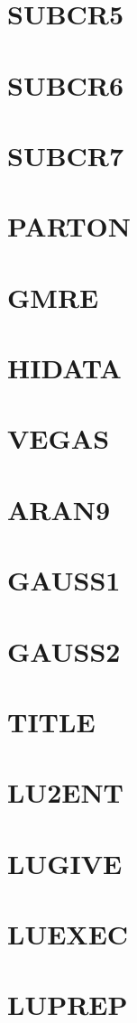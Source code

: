 \documentclass[14pt,UTF8]{ctexbook}
\begin{document}
\section{SUBCR5}
\section{SUBCR6}
\section{SUBCR7}
\section{PARTON}
\section{GMRE}
\section{HIDATA}
\section{VEGAS}
\section{ARAN9}
\section{GAUSS1}
\section{GAUSS2}
\section{TITLE}
\section{LU2ENT}
\section{LUGIVE}
\section{LUEXEC}
\section{LUPREP}
\end{document}
